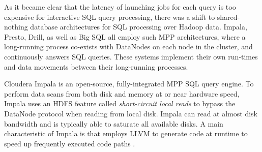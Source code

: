 \documentclass{vldb}
\begin{document}
As it became clear that the latency of launching jobs for each query is too expensive for interactive SQL query processing, there was a shift to shared-nothing database architectures for SQL processing over Hadoop data. Impala, Presto, Drill, as well as Big SQL all employ such MPP architectures, where a long-running process co-exists with DataNodes on each node in the cluster, and continuously answers SQL queries. These systems implement their own run-times and data movements between their long-running processes. 



Cloudera Impala \cite{Kornacker+15} is an open-source, fully-integrated MPP SQL query engine. 
To perform data scans from both disk and memory at or near hardware speed,
Impala uses an HDFS feature called {\em short-circuit local reads} 
to bypass the DataNode protocol when reading from local disk. Impala can read at almost disk bandwidth and is typically able to saturate all available disks. 
A main characteristic of Impala is that employs LLVM to generate code at runtime to speed up frequently executed code paths \cite{WandermanL14}. 
\end{document}
